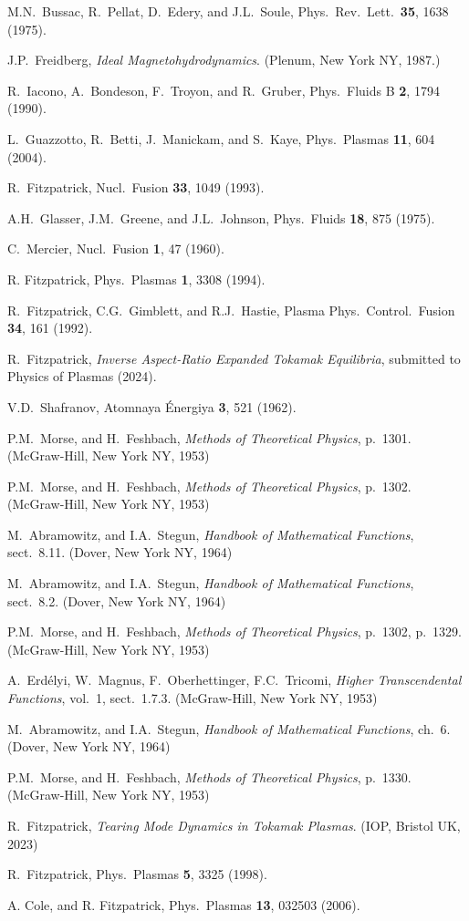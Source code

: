 \documentclass[12pt,prb,aps]{revtex4-1}
\begin{document}
\begin{thebibliography}{99}
 M.N.~Bussac, R.~Pellat, D.~Edery, and J.L.~Soule, Phys.\ Rev.\ Lett.\ {\bf 35}, 1638 (1975).

 J.P.~Freidberg, {\em Ideal Magnetohydrodynamics}. (Plenum, New York NY, 1987.)

 R.~Iacono, A.~Bondeson, F.~Troyon, and R.~Gruber, Phys.\ Fluids B {\bf 2}, 1794 (1990).

 L.~Guazzotto,  R.~Betti, J.~Manickam, and  S.~Kaye, Phys.\ Plasmas {\bf 11}, 604 (2004).

 R.~Fitzpatrick, Nucl.\ Fusion {\bf 33}, 1049 (1993).

 A.H.~Glasser, J.M.~Greene, and J.L.~Johnson, Phys.\ Fluids {\bf 18}, 875 (1975).

 C.~Mercier, Nucl.\ Fusion {\bf 1}, 47 (1960).

 R. Fitzpatrick, Phys.\ Plasmas {\bf 1}, 3308 (1994).

 R.~Fitzpatrick, C.G.~Gimblett, and R.J.~Hastie, Plasma Phys.\ Control.\ Fusion {\bf 34}, 161 (1992). 

 R.~Fitzpatrick, {\em Inverse Aspect-Ratio Expanded Tokamak Equilibria}, submitted to Physics of Plasmas (2024).

 V.D.~Shafranov, Atomnaya \'{E}nergiya {\bf 3}, 521  (1962).

 P.M.~Morse, and H.~Feshbach, {\em Methods of Theoretical Physics}, p.~1301. (McGraw-Hill, New York NY, 1953)

 P.M.~Morse, and H.~Feshbach, {\em Methods of Theoretical Physics}, p.~1302. (McGraw-Hill, New York NY, 1953)

 M.~Abramowitz, and I.A.~Stegun, {\em Handbook of Mathematical Functions}, sect.~8.11. (Dover, New York NY, 1964)

 M.~Abramowitz, and I.A.~Stegun, {\em Handbook of Mathematical Functions}, sect.~8.2. (Dover, New York NY, 1964)

 P.M.~Morse, and H.~Feshbach, {\em Methods of Theoretical Physics}, p.~1302, p.~1329. (McGraw-Hill, New York NY, 1953)

 A.~Erd\'{e}lyi, W.~Magnus, F.~Oberhettinger, F.C.~Tricomi, {\em Higher Transcendental Functions}, vol.~1, sect.~1.7.3. 
(McGraw-Hill, New York NY, 1953)

 M.~Abramowitz, and I.A.~Stegun, {\em Handbook of Mathematical Functions}, ch.~6. (Dover, New York NY, 1964)

 P.M.~Morse, and H.~Feshbach, {\em Methods of Theoretical Physics}, p.~1330. (McGraw-Hill, New York NY, 1953)

 R.~Fitzpatrick, {\em Tearing Mode Dynamics in Tokamak Plasmas}. (IOP, Bristol UK,  2023)

 R.~Fitzpatrick, Phys.\ Plasmas {\bf 5}, 3325 (1998).

 A. Cole, and R. Fitzpatrick, Phys.\ Plasmas {\bf 13}, 032503 (2006).

\end{thebibliography}
\end{document}
